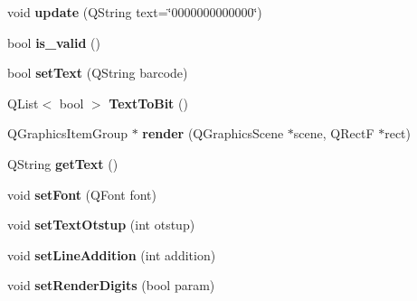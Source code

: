 \begin{DoxyCompactItemize}
\item 
\hypertarget{class_barcode_af1e79b41b9e2d70c5ba230445db2cff7}{void {\bfseries update} (\-Q\-String text=\char`\"{}0000000000000\char`\"{})}\label{class_barcode_af1e79b41b9e2d70c5ba230445db2cff7}

\item 
\hypertarget{class_barcode_aad21e37b9dfed87ec753410c243cbd50}{bool {\bfseries is\-\_\-valid} ()}\label{class_barcode_aad21e37b9dfed87ec753410c243cbd50}

\item 
\hypertarget{class_barcode_a8fb0e96373887cf5e5d7cff34949ecee}{bool {\bfseries set\-Text} (\-Q\-String barcode)}\label{class_barcode_a8fb0e96373887cf5e5d7cff34949ecee}

\item 
\hypertarget{class_barcode_acc70462eb19f5342a4cf5d995fd8ce29}{\-Q\-List$<$ bool $>$ {\bfseries \-Text\-To\-Bit} ()}\label{class_barcode_acc70462eb19f5342a4cf5d995fd8ce29}

\item 
\hypertarget{class_barcode_a98d528b5f8e7be35bb98b46f59e5dec4}{\-Q\-Graphics\-Item\-Group $\ast$ {\bfseries render} (\-Q\-Graphics\-Scene $\ast$scene, \-Q\-Rect\-F $\ast$rect)}\label{class_barcode_a98d528b5f8e7be35bb98b46f59e5dec4}

\item 
\hypertarget{class_barcode_a68149832ec7fabe2f5c26f18c4795041}{\-Q\-String {\bfseries get\-Text} ()}\label{class_barcode_a68149832ec7fabe2f5c26f18c4795041}

\item 
\hypertarget{class_barcode_a3f430c2efdb143a66e8ba0fbeecfe2d5}{void {\bfseries set\-Font} (\-Q\-Font font)}\label{class_barcode_a3f430c2efdb143a66e8ba0fbeecfe2d5}

\item 
\hypertarget{class_barcode_aa32b62bd9da77d5e491472f369a43f47}{void {\bfseries set\-Text\-Otstup} (int otstup)}\label{class_barcode_aa32b62bd9da77d5e491472f369a43f47}

\item 
\hypertarget{class_barcode_ac7f00c94f11f2122c43bec0b45e21deb}{void {\bfseries set\-Line\-Addition} (int addition)}\label{class_barcode_ac7f00c94f11f2122c43bec0b45e21deb}

\item 
\hypertarget{class_barcode_aed3c631ddafb1773a2a0431ed9a1c29b}{void {\bfseries set\-Render\-Digits} (bool param)}\label{class_barcode_aed3c631ddafb1773a2a0431ed9a1c29b}

\end{DoxyCompactItemize}
